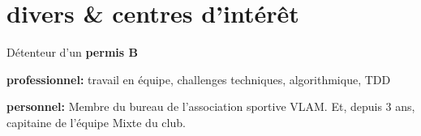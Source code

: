 \documentclass{friggeri-cv} 	%
\begin{document}

\section{divers \& centres d’intérêt}

Détenteur d’un \textbf{permis B}

\textbf{professionnel:} travail en équipe, challenges techniques, algorithmique, TDD

\textbf{personnel:} Membre du bureau de l’association sportive VLAM. Et, depuis 3 ans, capitaine de l’équipe Mixte du club.
\end{document}
